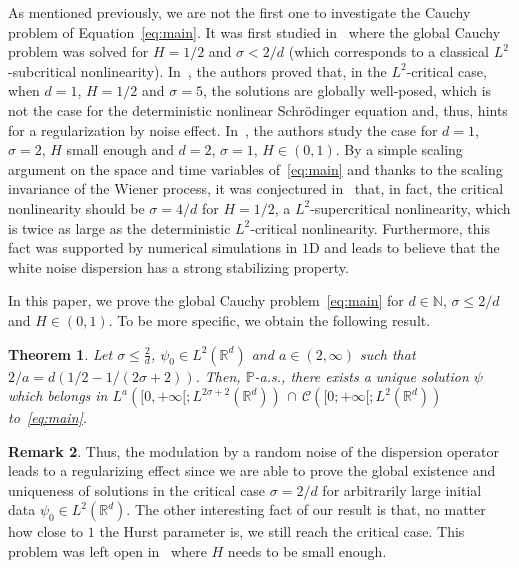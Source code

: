 \documentclass[10pt]{amsart}
\newtheorem{theo}{Theorem}[section]
\theoremstyle{definition}\newtheorem{defi}[theo]{Definition}\newtheorem{rema}[theo]{Remark}\newtheorem{exam}[theo]{Example}\newtheorem{exem}[theo]{Example}\newtheorem{nota}[theo]{Notation}
\newcommand{\bbP}{\mathbb{P}}
\newcommand{\bbR}{\mathbb{R}}
\newcommand{\bbN}{\mathbb{N}}
\newcommand{\clC}{\mathcal{C}}
\begin{document}
As mentioned previously, we are not the first one to investigate the Cauchy problem of Equation~\eqref{eq:main}. It was first studied in~\cite{de2010nonlinear} where the global Cauchy problem was solved for $H = 1/2$ and $\sigma < 2/d$ (which corresponds to a classical $L^2$-subcritical nonlinearity). In~\cite{debussche20111d}, the authors proved that, in the $L^2$-critical case, when $d = 1$, $H = 1/2$ and $\sigma = 5$, the solutions are globally well-posed, which is not the case for the deterministic nonlinear Schr\"odinger equation and, thus, hints for a regularization by noise effect. In~\cite{chouk2015nonlinear}, the authors study the case for $d=1$, $\sigma = 2$, $H$ small enough and $d=2$, $\sigma = 1$, $H\in(0,1)$. By a simple scaling argument on the space and time variables of~\eqref{eq:main} and thanks to the scaling invariance of the Wiener process, it was conjectured in~\cite{belaouar2015numerical} that, in fact, the critical nonlinearity should be $\sigma = 4/d$ for $H= 1/2$, a $L^2$-supercritical nonlinearity, which is twice as large as the deterministic $L^2$-critical nonlinearity. Furthermore, this fact was supported by numerical simulations in $1$D and leads to believe that the white noise dispersion has a strong stabilizing property.

In this paper, we prove the global Cauchy problem~\eqref{eq:main} for $d\in\bbN$, $\sigma\leq 2/d$ and $H\in(0,1)$. To be more specific, we obtain the following result.

\begin{theo}\label{thm:main}
Let $\sigma\leq \frac{2}{d}$, $\psi_0\in L^2(\bbR^d)$ and $a\in (2,\infty)$ such that $2/a = d\left(1/2-1/(2\sigma+2)\right)$. Then, $\bbP$-a.s., there exists a unique solution $\psi$ which belongs in $L^{a}([0,+\infty[;L^{2\sigma+2}(\bbR^d))\,\cap\, \clC([0;+\infty[;L^2(\bbR^d))$ to~\eqref{eq:main}.
\end{theo}

\begin{rema}
Thus, the modulation by a random noise of the dispersion operator leads to a regularizing effect since we are able to prove the global existence and uniqueness of solutions in the critical case $\sigma = 2/d$ for arbitrarily large initial data $\psi_0\in L^2(\bbR^d)$. The other interesting fact of our result is that, no matter how close to $1$ the Hurst parameter is, we still reach the critical case. This problem was left open in~\cite{chouk2015nonlinear} where $H$ needs to be small enough.
\end{rema}
\end{document}
